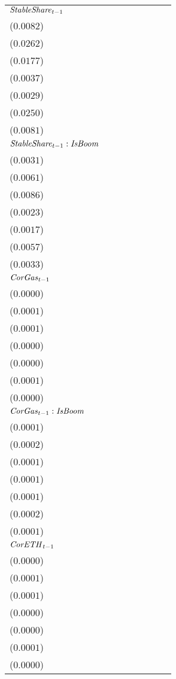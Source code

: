 \begin{tabular}{llllllll}
${\it StableShare}_{t-1}$ & \makecell{$0.0677^{***}$ \\ ($0.0082$)} & \makecell{$0.1950^{***}$ \\ ($0.0262$)} & \makecell{$0.1156^{***}$ \\ ($0.0177$)} & \makecell{$-0.0023^{}$ \\ ($0.0037$)} & \makecell{$-0.0075^{**}$ \\ ($0.0029$)} & \makecell{$0.2013^{***}$ \\ ($0.0250$)} & \makecell{$0.0700^{***}$ \\ ($0.0081$)} \\
${\it StableShare}_{t-1}:{\it IsBoom}$ & \makecell{$-0.0157^{***}$ \\ ($0.0031$)} & \makecell{$-0.0169^{***}$ \\ ($0.0061$)} & \makecell{$-0.0550^{***}$ \\ ($0.0086$)} & \makecell{$-0.0086^{***}$ \\ ($0.0023$)} & \makecell{$-0.0033^{*}$ \\ ($0.0017$)} & \makecell{$-0.0131^{**}$ \\ ($0.0057$)} & \makecell{$-0.0189^{***}$ \\ ($0.0033$)} \\
${\it CorGas}_{t-1}$ & \makecell{$0.0000^{}$ \\ ($0.0000$)} & \makecell{$0.0001^{}$ \\ ($0.0001$)} & \makecell{$0.0001^{}$ \\ ($0.0001$)} & \makecell{$0.0000^{}$ \\ ($0.0000$)} & \makecell{$0.0000^{}$ \\ ($0.0000$)} & \makecell{$0.0001^{}$ \\ ($0.0001$)} & \makecell{$0.0000^{}$ \\ ($0.0000$)} \\
${\it CorGas}_{t-1}:{\it IsBoom}$ & \makecell{$-0.0001^{**}$ \\ ($0.0001$)} & \makecell{$-0.0002^{}$ \\ ($0.0002$)} & \makecell{$0.0001^{}$ \\ ($0.0001$)} & \makecell{$0.0000^{}$ \\ ($0.0001$)} & \makecell{$-0.0000^{}$ \\ ($0.0001$)} & \makecell{$-0.0001^{}$ \\ ($0.0002$)} & \makecell{$-0.0001^{}$ \\ ($0.0001$)} \\
${\it CorETH}_{t-1}$ & \makecell{$-0.0001^{**}$ \\ ($0.0000$)} & \makecell{$-0.0001^{*}$ \\ ($0.0001$)} & \makecell{$-0.0002^{**}$ \\ ($0.0001$)} & \makecell{$-0.0000^{}$ \\ ($0.0000$)} & \makecell{$-0.0000^{}$ \\ ($0.0000$)} & \makecell{$-0.0001^{}$ \\ ($0.0001$)} & \makecell{$-0.0001^{**}$ \\ ($0.0000$)} \\

\end{tabular}
